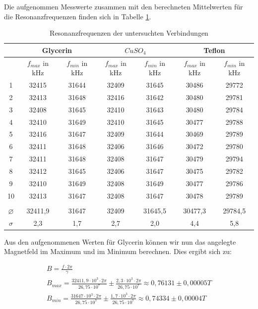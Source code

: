 Die aufgenommen Messwerte zusammen mit den berechneten Mittelwerten für die Resonanzfrequenzen finden sich in Tabelle \ref{freqs}.

\begin{table}[h]
	\caption{Resonanzfrequenzen der untersuchten Verbindungen}
	\begin{tabular}{|c|c|c|c|c|c|c|}
	\hline
	& \multicolumn{2}{|c|}{Glycerin} & \multicolumn{2}{|c|}{$CuSO_4$} & \multicolumn{2}{|c|}{Teflon} \\ \hline
	 & $f_{max}$ in kHz & $f_{min}$ in kHz & $f_{max}$ in kHz & $f_{min}$ in kHz & $f_{max}$ in kHz & $f_{min}$ in kHz\\ \hline
	 1 & 32415 & 31644 & 32409 & 31645 & 30486 & 29772 \\ \hline
	 2 & 32413 & 31648 & 32416 & 31642 & 30480 & 29781 \\ \hline
	 3 & 32408 & 31645 & 32410 & 31643 & 30480 & 29784 \\ \hline
	 4 & 32410 & 31649 & 32410 & 31645 & 30477 & 29788 \\ \hline
	 5 & 32416 & 31647 & 32409 & 31644 & 30469 & 29789 \\ \hline
	 6 & 32411 & 31648 & 32406 & 31646 & 30472 & 29780 \\ \hline
	 7 & 32411 & 31648 & 32408 & 31647 & 30479 & 29794 \\ \hline
	 8 & 32412 & 31645 & 32406 & 31647 & 30475 & 29782 \\ \hline
	 9 & 32410 & 31649 & 32408 & 31649 & 30477 & 29786 \\ \hline
	 10 & 32413 & 31647 & 32408 & 31647 & 30478 & 29789 \\ \hline \\ \hline
	 $ \varnothing $ & 32411,9 & 31647 & 32409 & 31645,5 & 30477,3 & 29784,5 \\ \hline
	 $\sigma$ & 2,3 & 1,7 & 2,7 & 2,0 & 4,4 & 5,8 \\ \hline
	\end{tabular}
\label{freqs}
\end{table}

Aus den aufgenommenen Werten für Glycerin können wir nun das angelegte Magnetfeld im Maximum und im Minimum berechnen. Dies ergibt sich zu:

\begin{gather}
B=\frac{f \cdot 2\pi}{\gamma} \\
B_{max}=\frac{32411,9 \cdot 10^3 \cdot 2\pi}{26,75 \cdot 10^7} \pm \frac{2,3 \cdot 10^3 \cdot 2\pi}{26,75 \cdot 10^7}  \approx 0,76131  \pm 0,00005 T \\
B_{min}=\frac{31647 \cdot 10^3 \cdot 2\pi}{26,75 \cdot 10^7} \pm \frac{1,7 \cdot 10^3 \cdot 2\pi}{26,75 \cdot 10^7}   \approx 0,74334 \pm 0,00004 T
\end{gather}

